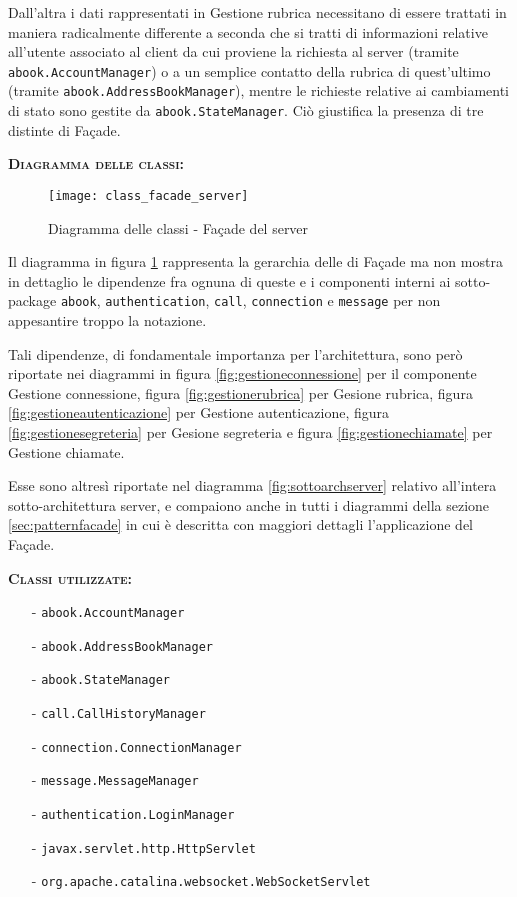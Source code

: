 \begin{description}
Dall'altra i dati rappresentati in \textsf{Gestione rubrica} necessitano di essere trattati in maniera radicalmente differente a seconda che si tratti di informazioni relative all'utente associato al client da cui proviene la richiesta al server (tramite \texttt{abook.AccountManager}) o a un semplice contatto della rubrica di quest'ultimo (tramite \texttt{abook.AddressBookManager}), mentre le richieste relative ai cambiamenti di stato sono gestite da \texttt{abook.StateManager}. Ciò giustifica la presenza di tre distinte  di Façade.

	\item{\scshape\bfseries Diagramma delle classi:}
\begin{figure}[H]
  \centering
  \texttt{[image: class\_facade\_server]}
  \caption{Diagramma delle classi - Façade del server}\label{fig:facadeserver}
\end{figure}

Il diagramma in figura \ref{fig:facadeserver} rappresenta la gerarchia delle  di Façade ma non mostra in dettaglio le dipendenze fra ognuna di queste e i componenti interni ai sotto-package \texttt{abook}, \texttt{authentication}, \texttt{call}, \texttt{connection} e \texttt{message} per non appesantire troppo la notazione.

Tali dipendenze, di fondamentale importanza per l'architettura, sono però riportate nei diagrammi in figura \vref{fig:gestioneconnessione} per il componente \textsf{Gestione connessione}, figura \vref{fig:gestionerubrica} per \textsf{Gesione rubrica}, figura \vref{fig:gestioneautenticazione} per \textsf{Gestione autenticazione}, figura \vref{fig:gestionesegreteria} per \textsf{Gesione segreteria} e figura \vref{fig:gestionechiamate} per \textsf{Gestione chiamate}.

Esse sono altresì riportate nel diagramma \vref{fig:sottoarchserver} relativo all'intera sotto-architettura server, e compaiono anche in tutti i diagrammi della sezione \vref{sec:patternfacade} in cui è descritta con maggiori dettagli l'applicazione del  Façade.
	
	\item{\scshape\bfseries Classi utilizzate:}\\
	\begin{itemize}[noitemsep,nolistsep]
	  \item[-] \texttt{abook.AccountManager}
	  \item[-] \texttt{abook.AddressBookManager}
	  \item[-] \texttt{abook.StateManager}
	  \item[-] \texttt{call.CallHistoryManager}
	  \item[-] \texttt{connection.ConnectionManager}
	  \item[-] \texttt{message.MessageManager}
    \item[-] \texttt{authentication.LoginManager}
	  \item[-] \texttt{javax.servlet.http.HttpServlet}
	  \item[-] \texttt{org.apache.catalina.websocket.WebSocketServlet}
	\end{itemize}
\end{description}

